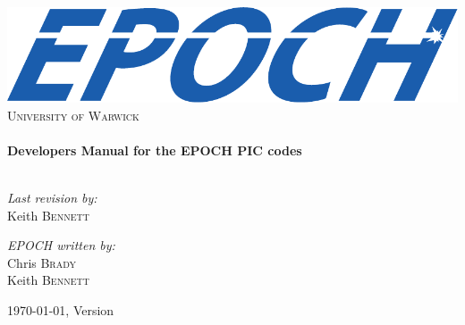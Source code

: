 
\begin{center}

\includegraphics[width=14cm]{./images/EPOCHLogo}\\[1cm]

\textsc{\LARGE{University of Warwick}}\\[1.5cm]

\HRule\\[0.2cm]%
{\huge\bfseries{Developers Manual for the EPOCH PIC codes}}\\[0.4cm]
\HRule\\[1.5cm]

\begin{minipage}{0.4\textwidth}
\begin{flushleft}\large%
\emph{Last revision by:}\\
Keith \textsc{Bennett}
\end{flushleft}
\end{minipage}
\begin{minipage}{0.4\textwidth}
\begin{flushright}\large%
\emph{EPOCH written by:} \\
Chris \textsc{Brady}\\
Keith \textsc{Bennett}\\
\end{flushright}
\end{minipage}

\vfill%
{\large\today, {\EPOCH} Version \version}

\end{center}

